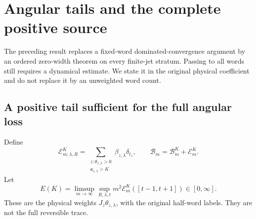 \section{Angular tails and the complete positive source}
\label{sec:v67-angular-tails}
The preceding result replaces a fixed-word dominated-convergence
argument by an ordered zero-width theorem on every finite-jet stratum.
Passing to all words still requires a dynamical estimate. We state it
in the original physical coefficient and do not replace it by an
unweighted word count.

\subsection{A positive tail sufficient for the full angular loss}
Define
\begin{equation}\label{eq:v67-bad-trace}
 \mathcal E^K_{m;\lambda,R}
   =\sum_{\substack{z:\theta_{z,\lambda}>0\\
                         \mathfrak a_{z,\lambda}>K}}
                   \beta_{z,\lambda}\delta_{t_z},\qquad
 \mathcal B_m=\mathcal B^K_m+\mathcal E^K_m.
\end{equation}
Let
\begin{equation}\label{eq:v67-tail-functional}
 E(K)=\limsup_{m\to\infty}\sup_{R,\lambda,t}
                     m^2\mathcal E^K_m([t-1,t+1])\in[0,\infty].
\end{equation}
These are the physical weights $J_z\theta_{z,\lambda}$, with the
original half-word labels. They are not the full reversible trace.

